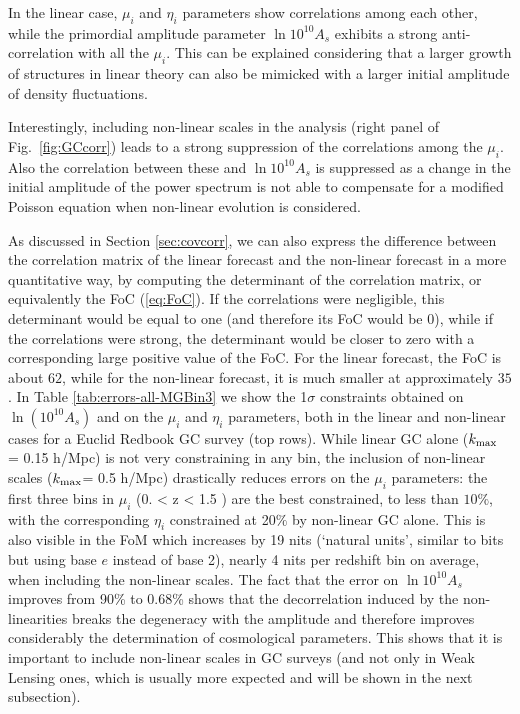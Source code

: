 In the linear case, $\mu_{i}$ and $\eta_{i}$ parameters show correlations
among each other, while the primordial
 amplitude parameter $\ln10^{10}A_{s}$ exhibits a strong anti-correlation with all the $\mu_{i}$.
This can be explained considering that a larger growth of
structures in linear theory can also be mimicked with a larger initial
amplitude of density fluctuations.

Interestingly, including non-linear scales in the analysis (right panel of Fig.\ \ref{fig:GCcorr})
leads to a strong suppression of the correlations among the $\mu_i$.
Also the correlation between these and $\ln10^{10}A_{s}$ is suppressed
as a change in the initial amplitude of the power spectrum is not able
to compensate for a modified Poisson equation when non-linear evolution 
is considered.

As discussed in Section \ref{sec:covcorr}, we can also express the difference between the correlation matrix of the linear forecast and the non-linear forecast in a more quantitative way, by computing the
determinant of the correlation matrix, or equivalently the FoC (\ref{eq:FoC}). 
If the correlations were negligible, this determinant would be equal to one (and therefore its FoC would be 0), while if the correlations were strong, the determinant
would be closer to zero with a corresponding large positive value of the FoC.
For the linear forecast, the FoC is about $62$, while for the non-linear forecast, it is much smaller at approximately $35$. 
In Table \ref{tab:errors-all-MGBin3} we show the 1$\sigma$ constraints obtained on $\ln{(10^{10}A_s)}$
and on the $\mu_i$ and $\eta_i$ parameters, both in the linear and 
non-linear cases for a Euclid Redbook GC survey (top rows).
While linear GC alone ($k_{\rm max}$ = 0.15 h/Mpc) is not very constraining in any bin, the inclusion of non-linear scales ($k_{\rm max} $= 0.5 h/Mpc) drastically reduces errors on the $\mu_{i}$ parameters: the first three bins in $\mu_i$ (0. < z < 1.5 ) are the best constrained, to less than $10\%$, with the corresponding $\eta_i$ constrained at 20$\%$ by non-linear GC alone. This is also visible in the FoM which increases by 19 nits (`natural units', similar to bits but using base $e$ instead of base 2), nearly 4 nits per redshift bin on average, when including the non-linear scales. The fact that the error on $\ln10^{10}A_{s}$ improves from 90\% to 0.68\% shows that the decorrelation induced by the non-linearities breaks the degeneracy with the amplitude and therefore improves considerably the determination of cosmological parameters. This shows that it is important to include non-linear scales in GC surveys (and not only in Weak Lensing ones, which is usually more expected and will be shown in the next subsection).


